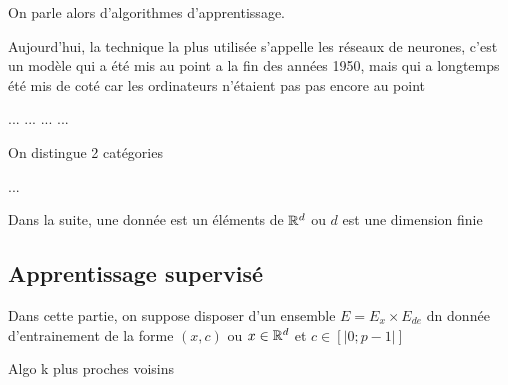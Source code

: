 \documentclass[a4paper,french,bookmarks]{article}
\begin{document}
        On parle alors d'algorithmes d'apprentissage.
    
    
        Aujourd'hui, la technique la plus utilisée s'appelle les réseaux de neurones, c'est un modèle qui a été mis au 
    point a la fin des années 1950, mais qui a longtemps été mis de coté car les ordinateurs n'étaient pas pas encore au point 
    
    ... ... ... ...
    \newline
    \newline
    
    On distingue 2 catégories 
    \begin{enumerate}
        \itast ...
    \end{enumerate}
    
    
    \newline \newline
    
    Dans la suite, une donnée est un éléments de $\mathbb{R}^d$ ou $d$ est une dimension finie 
    
    \subsection{Apprentissage supervisé} 
    
    Dans cette partie, on suppose disposer d'un ensemble $E=E_x \times E_{de}$ dn donnée d'entrainement de la forme $(x,c)$ ou $x\in \mathbb{R}^d$ et $c\in [| 0 ; p-1|]$
    
    \begin{definition}{Algo k plus proches voisins}
        
    \end{definition}
    
    
\end{document}
